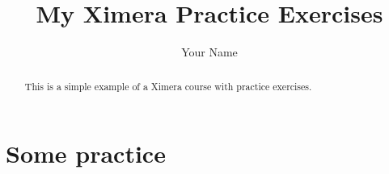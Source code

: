 \documentclass{ximera}
\title{My Ximera Practice Exercises}
\author{Your Name}
\begin{document}
\begin{abstract}
    This is a simple example of a Ximera course with practice exercises.
\end{abstract}

\maketitle
\part{Some practice}
\end{document}
